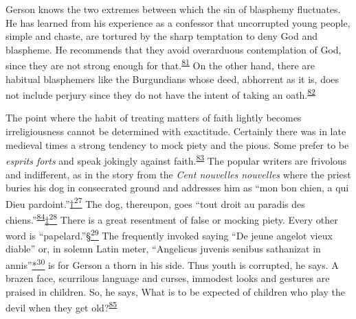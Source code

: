 Gerson knows the two extremes between which the sin of blasphemy
fluctuates. He has learned from his experience as a confessor that
uncorrupted young people, simple and chaste, are tortured by the sharp
temptation to deny God and blaspheme. He recommends that they avoid
overarduous contemplation of God, since they are not strong enough for
that.\textsuperscript{\protect\hypertarget{13_Chapter_Six__THE_DEPICTION_OF_TH.xhtmlux5cux23id_1110}{\protect\hyperlink{23_NOTES.xhtmlux5cux23id_1111}{81}}}
On the other hand, there are habitual blasphemers like the Burgundians
whose deed, abhorrent as it is, does not include perjury since they do
not have the intent of taking an
oath.\textsuperscript{\protect\hypertarget{13_Chapter_Six__THE_DEPICTION_OF_TH.xhtmlux5cux23id_1108}{\protect\hyperlink{23_NOTES.xhtmlux5cux23id_1109}{82}}}

The point where the habit of treating matters of faith lightly becomes
irreligiousness cannot be determined with exactitude. Certainly there
was in late medieval times a strong tendency to mock piety and the
pious. Some prefer to be \emph{esprits forts} and speak jokingly against
faith.\textsuperscript{\protect\hypertarget{13_Chapter_Six__THE_DEPICTION_OF_TH.xhtmlux5cux23id_1106}{\protect\hyperlink{23_NOTES.xhtmlux5cux23id_1107}{83}}}
The popular writers are frivolous and indifferent, as in the story from
the \emph{Cent nouvelles nouvelles} where the priest buries his dog in
consecrated ground and addresses him as ``mon bon chien, a qui Dieu
pardoint.''\protect\hypertarget{13_Chapter_Six__THE_DEPICTION_OF_TH.xhtmlux5cux23id_3041}{\protect\hyperlink{23_NOTES.xhtmlux5cux23id_3042}{†\textsuperscript{27}}}
The dog, thereupon, goes ``tout droit au paradis des
chiens.''\textsuperscript{\protect\hypertarget{13_Chapter_Six__THE_DEPICTION_OF_TH.xhtmlux5cux23id_1104}{\protect\hyperlink{23_NOTES.xhtmlux5cux23id_1105}{84}}}\protect\hypertarget{13_Chapter_Six__THE_DEPICTION_OF_TH.xhtmlux5cux23id_3043}{\protect\hyperlink{23_NOTES.xhtmlux5cux23id_3044}{‡\textsuperscript{28}}}
There is a great resentment of false or mocking piety. Every other word
is
``papelard.''\protect\hypertarget{13_Chapter_Six__THE_DEPICTION_OF_TH.xhtmlux5cux23id_3045}{\protect\hyperlink{23_NOTES.xhtmlux5cux23id_3046}{§\textsuperscript{29}}}
The
\protect\hypertarget{13_Chapter_Six__THE_DEPICTION_OF_TH.xhtmlux5cux23page_188}{}{}frequently
invoked saying ``De jeune angelot vieux diable'' or, in solemn Latin
meter, ``Angelicus juvenis senibus sathanizat in
annis''\protect\hypertarget{13_Chapter_Six__THE_DEPICTION_OF_TH.xhtmlux5cux23id_3047}{\protect\hyperlink{23_NOTES.xhtmlux5cux23id_3048}{*\textsuperscript{30}}}
is for Gerson a thorn in his side. Thus youth is corrupted, he says. A
brazen face, scurrilous language and curses, immodest looks and gestures
are praised in children. So, he says, What is to be expected of children
who play the devil when they get
old?\textsuperscript{\protect\hypertarget{13_Chapter_Six__THE_DEPICTION_OF_TH.xhtmlux5cux23id_1102}{\protect\hyperlink{23_NOTES.xhtmlux5cux23id_1103}{85}}}

